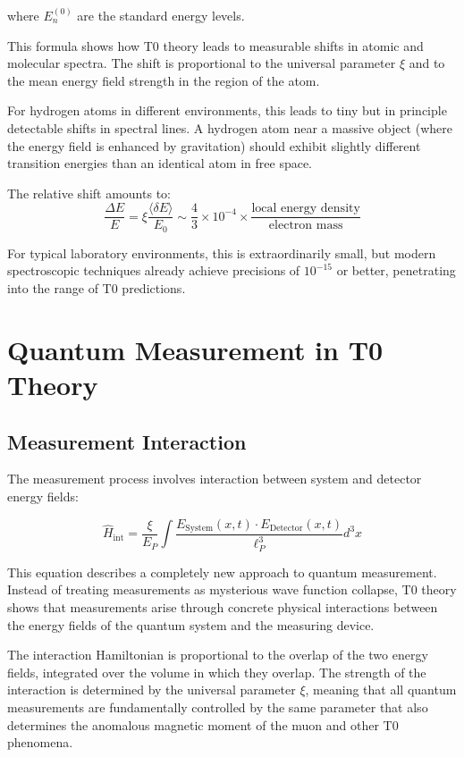 \documentclass[12pt,a4paper]{article}
\newcommand{\deltaE}{\delta E}
\newcommand{\xipar}{\xi}
\newcommand{\EPlanck}{E_P}
\theoremstyle{definition}
\theoremstyle{remark}
\begin{document}
	where $E_n^{(0)}$ are the standard energy levels.
	
	This formula shows how T0 theory leads to measurable shifts in atomic and molecular spectra. The shift is proportional to the universal parameter $\xipar$ and to the mean energy field strength in the region of the atom.
	
	For hydrogen atoms in different environments, this leads to tiny but in principle detectable shifts in spectral lines. A hydrogen atom near a massive object (where the energy field is enhanced by gravitation) should exhibit slightly different transition energies than an identical atom in free space.
	
	The relative shift amounts to:
	$$\frac{\Delta E}{E} = \xipar \frac{\langle \deltaE \rangle}{E_0} \sim \frac{4}{3} \times 10^{-4} \times \frac{\text{local energy density}}{\text{electron mass}}$$
	
	For typical laboratory environments, this is extraordinarily small, but modern spectroscopic techniques already achieve precisions of $10^{-15}$ or better, penetrating into the range of T0 predictions.
	
	\section{Quantum Measurement in T0 Theory}
	
	\subsection{Measurement Interaction}
	
	The measurement process involves interaction between system and detector energy fields:
	
	\begin{equation}
		\hat{H}_{\text{int}} = \frac{\xipar}{\EPlanck} \int \frac{E_{\text{System}}(x,t) \cdot E_{\text{Detector}}(x,t)}{\ell_P^3} d^3x
		\label{eq:measurement_interaction}
	\end{equation}
	
	This equation describes a completely new approach to quantum measurement. Instead of treating measurements as mysterious wave function collapse, T0 theory shows that measurements arise through concrete physical interactions between the energy fields of the quantum system and the measuring device.
	
	The interaction Hamiltonian is proportional to the overlap of the two energy fields, integrated over the volume in which they overlap. The strength of the interaction is determined by the universal parameter $\xipar$, meaning that all quantum measurements are fundamentally controlled by the same parameter that also determines the anomalous magnetic moment of the muon and other T0 phenomena.
	
\end{document}
